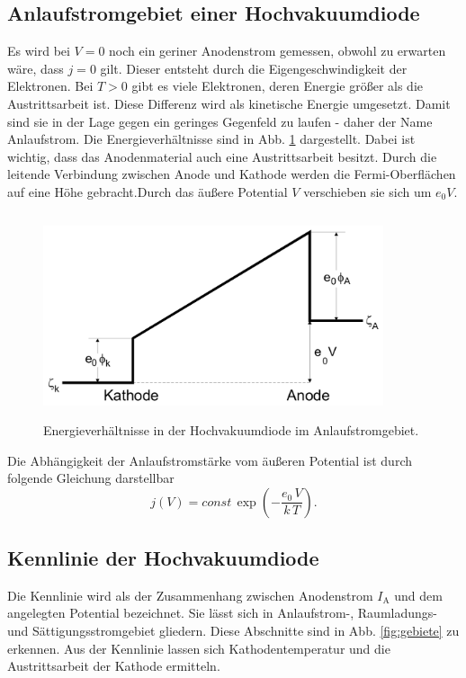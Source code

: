\subsection{Anlaufstromgebiet einer Hochvakuumdiode}

Es wird bei $V = 0$ noch ein geriner Anodenstrom gemessen, 
obwohl zu erwarten wäre, dass $j = 0$ gilt. Dieser entsteht 
durch die Eigengeschwindigkeit der Elektronen. Bei $T > 0$ 
gibt es viele Elektronen, deren Energie größer als die 
Austrittsarbeit ist. Diese Differenz wird als kinetische 
Energie umgesetzt. Damit sind sie in der Lage gegen ein 
geringes Gegenfeld zu laufen - daher der Name Anlaufstrom. 
Die Energieverhältnisse sind in Abb. \ref{fig:energie}
dargestellt. Dabei ist wichtig, dass das Anodenmaterial auch 
eine Austrittsarbeit besitzt. Durch die leitende Verbindung 
zwischen Anode und Kathode werden die Fermi-Oberflächen auf 
eine Höhe gebracht.Durch das äußere Potential $V$ 
verschieben sie sich um $e_0 V$.

\begin{figure}
    \centering
    \includegraphics[width=10cm, height=6cm]{build/energie.png}
    \caption{Energieverhältnisse in der Hochvakuumdiode im Anlaufstromgebiet. \cite{V504}}
    \label{fig:energie}
\end{figure}

\noindent Die Abhängigkeit der Anlaufstromstärke vom äußeren
Potential ist durch folgende Gleichung darstellbar
\begin{equation}
    j(V) = const \, \exp(-\frac{e_0 \, V}{k \, T}).
    \label{eqn:anlauf}
\end{equation}

\subsection{Kennlinie der Hochvakuumdiode}

Die Kennlinie wird als der Zusammenhang zwischen Anodenstrom 
$I_\text{A}$ und dem angelegten Potential bezeichnet. 
Sie lässt sich in Anlaufstrom-, Raumladungs- und 
Sättigungsstromgebiet gliedern. 
Diese Abschnitte sind in Abb. \ref{fig:gebiete} zu erkennen.
Aus der Kennlinie lassen sich Kathodentemperatur und die 
Austrittsarbeit der Kathode ermitteln.

